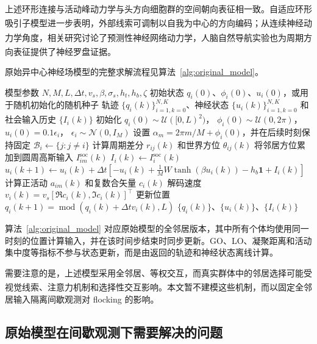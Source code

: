\documentclass[UTF8,fontset=windows,11pt]{ctexart}
\newcommand{\upcite}[1]{\textsuperscript{\cite{#1}}}
\begin{document}
上述环形连接与活动峰动力学与头方向细胞群的空间朝向表征\upcite{Zhang1996}相一致。自适应环形吸引子模型进一步表明，外部线索可调制以自我为中心的方向编码\upcite{Chen2026}；从连续神经动力学角度，相关研究讨论了预测性神经网络动力学\upcite{Ao2021}，人脑自然导航实验也为周期方向表征提供了神经罗盘证据\upcite{Lu2025}。

原始异中心神经场模型的完整求解流程见算法~\ref{alg:original_model}。

\begin{algorithm}[htbp]
 \caption{原始异中心神经场集群运动}
 \label{alg:original_model}
 \begin{algorithmic}[1]
 \Require 模型参数 $N,M,L,\Delta t,v_s,\beta,\sigma_s,h_t,h_b,\zeta$
 \Require 初始状态 $q_i(0)$、$\phi_i(0)$、$u_i(0)$，或用于随机初始化的随机种子
 \Ensure 轨迹 $\{q_i(k)\}_{i=1,k=0}^{N,K}$、神经状态 $\{u_i(k)\}_{i=1,k=0}^{N,K}$ 和社会输入历史 $\{I_i(k)\}$
 \State 初始化
 $q_i(0)\sim\mathcal U([0,L)^2)$，
 $\phi_i(0)\sim\mathcal U(0,2\pi)$，
 $u_i(0)=0.1\epsilon_i$，
 $\epsilon_i\sim\mathcal N(0,I_M)$
 \State 设置 $\alpha_m=2\pi m/M+\phi_i(0)$，并在后续时刻保持固定
   \State $\mathcal B_i\leftarrow\{j:j\ne i\}$
    \State 计算周期差分 $r_{ij}(k)$ 和世界方位 $\theta_{ij}(k)$
    \State 将邻居方位累加到圆周高斯输入 $I^{\mathrm{soc}}_{im}(k)$
   \EndFor
   \State $I_i(k)\leftarrow I^{\mathrm{soc}}_{i}(k)$
   \State $u_i(k+1)\leftarrow
   u_i(k)+\Delta t\left[-u_i(k)+\frac{1}{M}W\tanh(\beta u_i(k))-h_b\mathbf 1+I_i(k)\right]$
   \State 计算正活动 $a_{im}(k)$ 和复数合矢量 $c_i(k)$
   \State 解码速度 $v_i(k)=v_s[\Re c_i(k),\Im c_i(k)]^\top$
  \EndFor
   \State 更新位置 $q_i(k+1)=\operatorname{mod}(q_i(k)+\Delta t v_i(k),L)$
  \EndFor
 \EndFor
 \State \Return $\{q_i(k)\}$、$\{u_i(k)\}$、$\{I_i(k)\}$
 \end{algorithmic}
\end{algorithm}

算法~\ref{alg:original_model} 对应原始模型的全邻居版本，其中所有个体均使用同一时刻的位置计算输入，并在该时间步结束时同步更新。GO、LO、凝聚距离和活动集中度等指标不参与状态更新，而是由返回的轨迹和神经状态离线计算。

需要注意的是，上述模型采用全邻居、等权交互，而真实群体中的邻居选择可能受视觉线索\upcite{Krongauz2024}、注意力机制\upcite{Li2024}和选择性交互\upcite{Xue2025}影响。本文暂不建模这些机制，而以固定全邻居输入隔离间歇观测对 flocking 的影响。

\subsection{原始模型在间歇观测下需要解决的问题}
\end{document}
